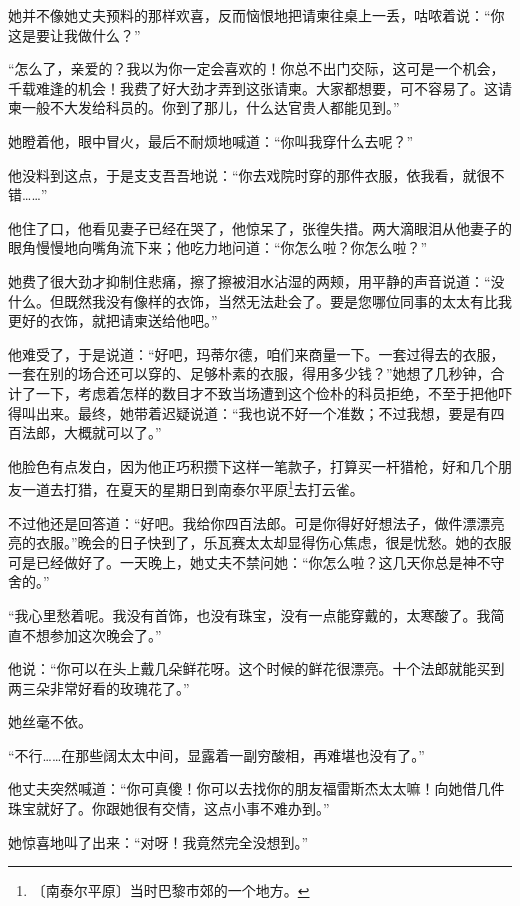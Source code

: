 \documentclass[12pt,UTF-8,openany]{ctexbook}
\begin{document}
\begin{large}
    她并不像她丈夫预料的那样欢喜，反而恼恨地把请柬往桌上一丢，咕哝着说：“你这是要让我做什么？”
    
    “怎么了，亲爱的？我以为你一定会喜欢的！你总不出门交际，这可是一个机会，千载难逢的机会！我费了好大劲才弄到这张请柬。大家都想要，可不容易了。这请柬一般不大发给科员的。你到了那儿，什么达官贵人都能见到。”
    
    她瞪着他，眼中冒火，最后不耐烦地喊道：“你叫我穿什么去呢？”
    
    他没料到这点，于是支支吾吾地说：“你去戏院时穿的那件衣服，依我看，就很不错……”
    
    他住了口，他看见妻子已经在哭了，他惊呆了，张徨失措。两大滴眼泪从他妻子的眼角慢慢地向嘴角流下来；他吃力地问道：“你怎么啦？你怎么啦？”
    
    她费了很大劲才抑制住悲痛，擦了擦被泪水沾湿的两颊，用平静的声音说道：“没什么。但既然我没有像样的衣饰，当然无法赴会了。要是您哪位同事的太太有比我更好的衣饰，就把请柬送给他吧。”
    
    他难受了，于是说道：“好吧，玛蒂尔德，咱们来商量一下。一套过得去的衣服，一套在别的场合还可以穿的、足够朴素的衣服，得用多少钱？”她想了几秒钟，合计了一下，考虑着怎样的数目才不致当场遭到这个俭朴的科员拒绝，不至于把他吓得叫出来。最终，她带着迟疑说道：“我也说不好一个准数；不过我想，要是有四百法郎，大概就可以了。”
    
    他脸色有点发白，因为他正巧积攒下这样一笔款子，打算买一杆猎枪，好和几个朋友一道去打猎，在夏天的星期日到南泰尔平原\footnote{〔南泰尔平原〕当时巴黎市郊的一个地方。}去打云雀。
    
    不过他还是回答道：“好吧。我给你四百法郎。可是你得好好想法子，做件漂漂亮亮的衣服。”晚会的日子快到了，乐瓦赛太太却显得伤心焦虑，很是忧愁。她的衣服可是已经做好了。一天晚上，她丈夫不禁问她：“你怎么啦？这几天你总是神不守舍的。”
    
    “我心里愁着呢。我没有首饰，也没有珠宝，没有一点能穿戴的，太寒酸了。我简直不想参加这次晚会了。”
    
    他说：“你可以在头上戴几朵鲜花呀。这个时候的鲜花很漂亮。十个法郎就能买到两三朵非常好看的玫瑰花了。”
    
    她丝毫不依。
    
    “不行……在那些阔太太中间，显露着一副穷酸相，再难堪也没有了。”
    
    他丈夫突然喊道：“你可真傻！你可以去找你的朋友福雷斯杰太太嘛！向她借几件珠宝就好了。你跟她很有交情，这点小事不难办到。”
    
    她惊喜地叫了出来：“对呀！我竟然完全没想到。”
    

\end{large}
\end{document}
